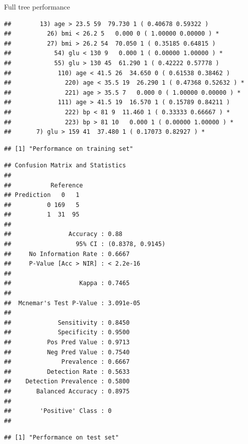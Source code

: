 \documentclass[
  ignorenonframetext,
]{beamer}
\begin{document}
\begin{frame}[fragile]
\begin{block}{Full tree performance}
\begin{verbatim}
##        13) age > 23.5 59  79.730 1 ( 0.40678 0.59322 )  
##          26) bmi < 26.2 5   0.000 0 ( 1.00000 0.00000 ) *
##          27) bmi > 26.2 54  70.050 1 ( 0.35185 0.64815 )  
##            54) glu < 130 9   0.000 1 ( 0.00000 1.00000 ) *
##            55) glu > 130 45  61.290 1 ( 0.42222 0.57778 )  
##             110) age < 41.5 26  34.650 0 ( 0.61538 0.38462 )  
##               220) age < 35.5 19  26.290 1 ( 0.47368 0.52632 ) *
##               221) age > 35.5 7   0.000 0 ( 1.00000 0.00000 ) *
##             111) age > 41.5 19  16.570 1 ( 0.15789 0.84211 )  
##               222) bp < 81 9  11.460 1 ( 0.33333 0.66667 ) *
##               223) bp > 81 10   0.000 1 ( 0.00000 1.00000 ) *
##       7) glu > 159 41  37.480 1 ( 0.17073 0.82927 ) *
\end{verbatim}

\begin{verbatim}
## [1] "Performance on training set"
\end{verbatim}

\begin{verbatim}
## Confusion Matrix and Statistics
## 
##           Reference
## Prediction   0   1
##          0 169   5
##          1  31  95
##                                           
##                Accuracy : 0.88            
##                  95% CI : (0.8378, 0.9145)
##     No Information Rate : 0.6667          
##     P-Value [Acc > NIR] : < 2.2e-16       
##                                           
##                   Kappa : 0.7465          
##                                           
##  Mcnemar's Test P-Value : 3.091e-05       
##                                           
##             Sensitivity : 0.8450          
##             Specificity : 0.9500          
##          Pos Pred Value : 0.9713          
##          Neg Pred Value : 0.7540          
##              Prevalence : 0.6667          
##          Detection Rate : 0.5633          
##    Detection Prevalence : 0.5800          
##       Balanced Accuracy : 0.8975          
##                                           
##        'Positive' Class : 0               
## 
\end{verbatim}

\begin{verbatim}
## [1] "Performance on test set"
\end{verbatim}


\end{block}
\end{frame}
\end{document}
